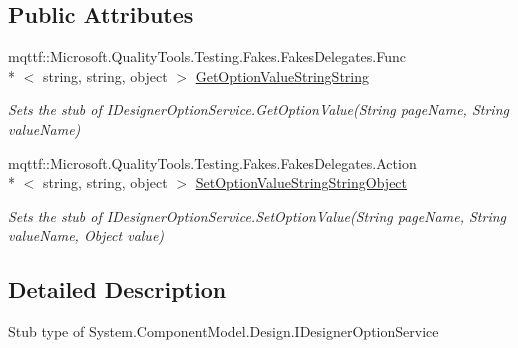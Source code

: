 \subsection*{Public Attributes}
\begin{DoxyCompactItemize}
\item 
mqttf\-::\-Microsoft.\-Quality\-Tools.\-Testing.\-Fakes.\-Fakes\-Delegates.\-Func\\*
$<$ string, string, object $>$ \hyperlink{class_system_1_1_component_model_1_1_design_1_1_fakes_1_1_stub_i_designer_option_service_acb5d745a90ee3adbf5ed2318d668cbd1}{Get\-Option\-Value\-String\-String}
\begin{DoxyCompactList}\small\item\em Sets the stub of I\-Designer\-Option\-Service.\-Get\-Option\-Value(\-String page\-Name, String value\-Name)\end{DoxyCompactList}\item 
mqttf\-::\-Microsoft.\-Quality\-Tools.\-Testing.\-Fakes.\-Fakes\-Delegates.\-Action\\*
$<$ string, string, object $>$ \hyperlink{class_system_1_1_component_model_1_1_design_1_1_fakes_1_1_stub_i_designer_option_service_ad9fb282f258e1e0559a2fdb245c1b873}{Set\-Option\-Value\-String\-String\-Object}
\begin{DoxyCompactList}\small\item\em Sets the stub of I\-Designer\-Option\-Service.\-Set\-Option\-Value(\-String page\-Name, String value\-Name, Object value)\end{DoxyCompactList}\end{DoxyCompactItemize}


\subsection{Detailed Description}
Stub type of System.\-Component\-Model.\-Design.\-I\-Designer\-Option\-Service



